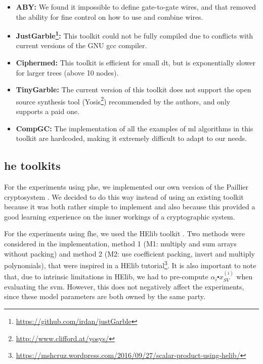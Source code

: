 \begin{itemize}
    
    \item\textbf{ABY\cite{demmler2015aby}:} We found it impossible to define gate-to-gate wires, and that removed the ability for fine control on how to use and combine wires.

    \item\textbf{JustGarble\footnote{\url{https://github.com/irdan/justGarble}}:} This toolkit could not be fully compiled due to conflicts with current versions of the GNU gcc compiler.

    \item\textbf{Ciphermed\cite{bost2015machine}:} This toolkit is efficient for small \ac{dt}, but is exponentially slower for larger trees (above 10 nodes).

    \item\textbf{TinyGarble\cite{songhori2015tinygarble}:} The current version of this toolkit does not support the open source synthesis tool (Yosis\footnote{\url{http://www.clifford.at/yosys/}}) recommended by the authors, and only supports a paid one.

    \item\textbf{CompGC\cite{groce2016compgc}:} The implementation of all the examples of \ac{ml} algorithms in this toolkit are hardcoded, making it extremely difficult to adapt to our needs.

\end{itemize}

\subsection{\acl{he} toolkits}

For the experiments using \ac{phe}, we implemented our own version of the Paillier cryptosystem \cite{paillier1999public}. We decided to do this way instead of using an existing toolkit because it was both rather simple to implement and also because this provided a good learning experience on the inner workings of a cryptographic system.

For the experiments using \ac{fhe}, we used the HElib toolkit \cite{halevi2014helib}. Two methods were considered in the implementation, method 1 (M1: multiply and sum arrays without packing) and method 2 (M2: use coefficient packing, invert and multiply polynomials), that were inspired in a HElib tutorial\footnote{\url{https://mshcruz.wordpress.com/2016/09/27/scalar-product-using-helib/}}. It is also important to note that, due to intrinsic limitations in HElib, we had to pre-compute $\alpha_i\centerdot x_{SV}^{(i)}$ when evaluating the \ac{svm}. However, this does not negatively affect the experiments, since these model parameters are both owned by the same party.



